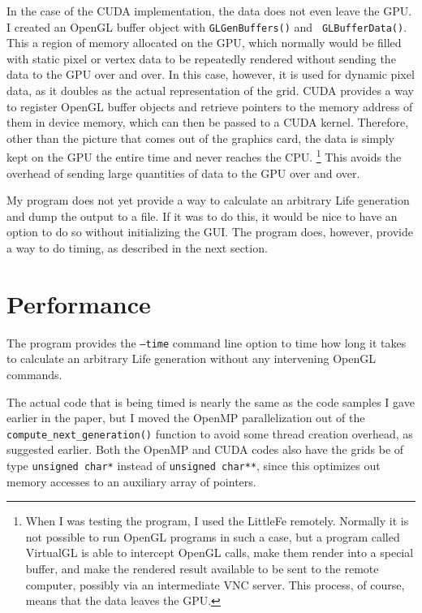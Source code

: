 \documentclass[letterpaper,12pt]{article}
\begin{document}
In the case of the CUDA implementation, the data does not even leave the GPU.  I
created an OpenGL buffer object with {\tt GLGenBuffers()} and {\tt
GLBufferData()}.  This a region of memory allocated on the GPU, which normally
would be filled with static pixel or vertex data to be repeatedly rendered
without sending the data to the GPU over and over.  In this case, however, it is
used for dynamic pixel data, as it doubles as the actual representation of the
grid.  CUDA provides a way to register OpenGL buffer objects and retrieve
pointers to the memory address of them in device memory, which can then be
passed to a CUDA kernel.  Therefore, other than the picture that comes out of
the graphics card, the data is simply kept on the GPU the entire time and never
reaches the CPU.  \footnote{When I was testing the program, I used the LittleFe
remotely.  Normally it is not possible to run OpenGL programs in such a case,
but a program called VirtualGL is able to intercept OpenGL calls, make them
render into a special buffer, and make the rendered result available to be sent
to the remote computer, possibly via an intermediate VNC server.  This process,
of course, means that the data leaves the GPU.} This avoids the overhead of
sending large quantities of data to the GPU over and over.  

My program does not yet provide a way to calculate an arbitrary Life generation
and dump the output to a file.  If it was to do this, it would be nice to have
an option to do so without initializing the GUI.  The program does, however,
provide a way to do timing, as described in the next section. 

\section{Performance}

The program provides the {\tt --time} command line option to time how long it
takes to calculate an arbitrary Life generation without any intervening OpenGL
commands. 

The actual code that is being timed is nearly the same as the code samples I
gave earlier in the paper, but I moved the OpenMP parallelization out of the
{\tt compute\_next\_generation()} function to avoid some thread creation
overhead, as suggested earlier.  Both the OpenMP and CUDA codes also have the
grids be of type {\tt unsigned char*} instead of {\tt unsigned char**}, since
this optimizes out memory accesses to an auxiliary array of pointers.
\end{document}
